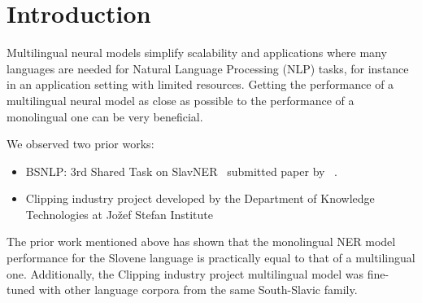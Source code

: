 \documentclass[sigconf]{acmart}
\begin{document}


\maketitle

\section{Introduction}
\label{sec:introduction}

Multilingual neural models simplify scalability and applications where many languages are needed for Natural Language Processing (NLP) tasks, for instance in an application setting with limited resources.
Getting the performance of a multilingual neural model as close as possible to the performance of a monolingual one can be very beneficial.


We observed two prior works:
\begin{itemize}
\item BSNLP: 3rd Shared Task on SlavNER~\cite{piskorski-etal-2021-slav} submitted paper by ~\citet{prelevikj-zitnik-2021-multilingual}.
\item Clipping industry project developed by the Department of Knowledge Technologies at Jo\v{z}ef Stefan Institute~\cite{KTIJS}
\end{itemize}
The prior work mentioned above has shown that the monolingual NER model performance for the Slovene language is practically equal to that of a multilingual one.
Additionally, the Clipping industry project multilingual model was fine-tuned with other language corpora from the same South-Slavic family.
\end{document}
